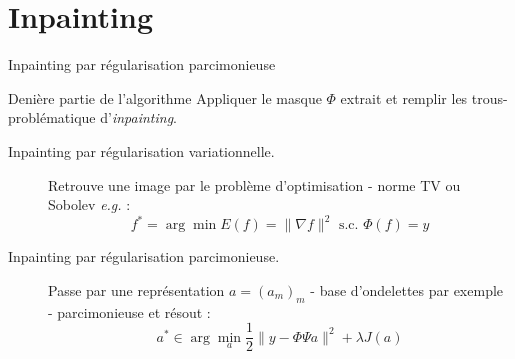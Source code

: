 \section{Inpainting}

\begin{frame}{Inpainting par régularisation parcimonieuse}
\begin{block}{Denière partie de l'algorithme}
Appliquer le masque $\Phi$ extrait et remplir les \og trous\fg - problématique d'\emph{inpainting}.
\end{block}
\begin{description}
\item[Inpainting par régularisation variationnelle. ]Retrouve une image par le problème d'optimisation - norme TV ou Sobolev \emph{e.g.} :
\begin{equation}
f^* = \arg \min E(f) = \|\nabla f \|^2 \text{ s.c. } \Phi(f) = y
\end{equation}

\item[Inpainting par régularisation parcimonieuse. ]Passe par une représentation $a = (a_m)_m$ - base d'ondelettes par exemple - parcimonieuse et résout : 
\begin{equation}
a^* \in \arg \min_a \frac{1}{2} \| y - \Phi \Psi a \|^2 + \lambda J(a)
\end{equation}
\end{description}
\end{frame}


\begin{frame}

\end{frame}
